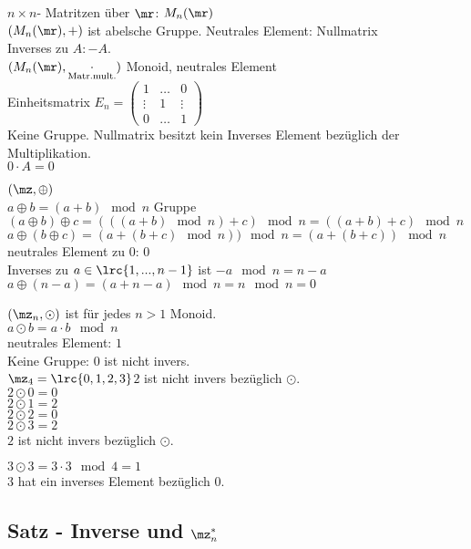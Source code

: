 		\item $n\times n$- Matritzen über $\mr$: $M_n(\mr)$\\
		$(M_n(\mr),+)$ ist abelsche Gruppe. Neutrales Element: Nullmatrix\\
		Inverses zu $A:-A$.\\
		$(M_n(\mr),\underset{\mbox{\scriptsize Matr.mult.}}{\cdot})$ Monoid, neutrales Element\\
		Einheitsmatrix $E_n=\begin{pmatrix}1&\dots&0\\\vdots&1&\vdots\\0&\dots&1
		\end{pmatrix}$\\
		Keine Gruppe. Nullmatrix besitzt kein Inverses Element bezüglich der Multiplikation.\\
		$0\cdot A=0$
		\item $(\mz,\oplus)$\\
		$a\oplus b=(a+b)\mod n$ Gruppe\\
		$(a\oplus b)\oplus c=(((a+b)\mod n)+c)\mod n=((a+b)+c)\mod n$\\
		$a\oplus(b\oplus c)=(a+(b+c)\mod n))\mod n=(a+(b+c))\mod n$\\
		neutrales Element zu $0$: $0$\\
		Inverses zu $a\in\lrc{1,...,n-1}$ ist $-a\mod n=n-a$\\
		$a\oplus(n-a)=(a+n-a)\mod n=n\mod n=0$
		\item $(\mz_n,\odot)$ ist für jedes $n>1$ Monoid.\\
		$a\odot b=a\cdot b\mod n$\\
		neutrales Element: $1$\\
		Keine Gruppe: $0$ ist nicht invers.\\
		$\mz_4=\lrc{0,1,2,3}$\quad $2$ ist nicht invers bezüglich $\odot$.\\
		$2\odot 0=0$\\
		$2\odot 1=2$\\
		$2\odot 2=0$\\
		$2\odot 3=2$\\
		$2$ ist nicht invers bezüglich $\odot$.
		
		$3\odot 3=3\cdot 3\mod 4=1$\\
		$3$ hat ein inverses Element bezüglich $0$.
	\subExEnd
	
	\subsection{Satz - Inverse und \texorpdfstring{$\mz^*_n$}{Z*}}
	
